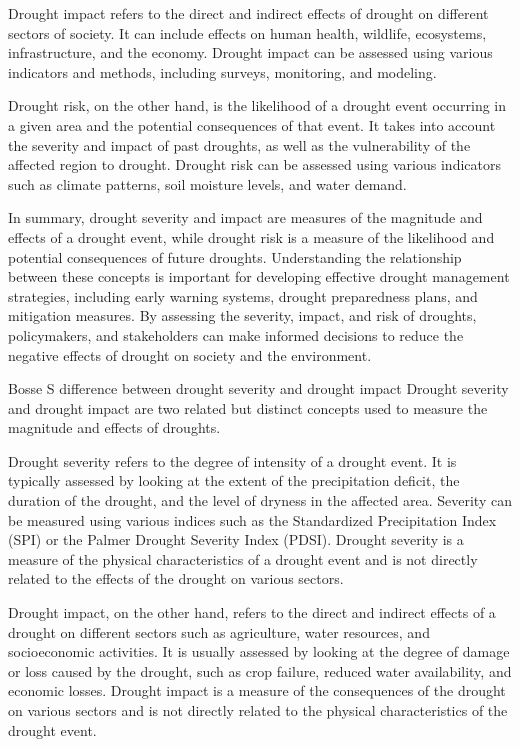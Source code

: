 {Drought impact refers to the direct and indirect effects of drought on different sectors of society. It can include effects on human health, wildlife, ecosystems, infrastructure, and the economy. Drought impact can be assessed using various indicators and methods, including surveys, monitoring, and modeling.

Drought risk, on the other hand, is the likelihood of a drought event occurring in a given area and the potential consequences of that event. It takes into account the severity and impact of past droughts, as well as the vulnerability of the affected region to drought. Drought risk can be assessed using various indicators such as climate patterns, soil moisture levels, and water demand.

In summary, drought severity and impact are measures of the magnitude and effects of a drought event, while drought risk is a measure of the likelihood and potential consequences of future droughts. Understanding the relationship between these concepts is important for developing effective drought management strategies, including early warning systems, drought preparedness plans, and mitigation measures. By assessing the severity, impact, and risk of droughts, policymakers, and stakeholders can make informed decisions to reduce the negative effects of drought on society and the environment.




Bosse S
difference between drought severity and drought impact
Drought severity and drought impact are two related but distinct concepts used to measure the magnitude and effects of droughts.

Drought severity refers to the degree of intensity of a drought event. It is typically assessed by looking at the extent of the precipitation deficit, the duration of the drought, and the level of dryness in the affected area. Severity can be measured using various indices such as the Standardized Precipitation Index (SPI) or the Palmer Drought Severity Index (PDSI). Drought severity is a measure of the physical characteristics of a drought event and is not directly related to the effects of the drought on various sectors.

Drought impact, on the other hand, refers to the direct and indirect effects of a drought on different sectors such as agriculture, water resources, and socioeconomic activities. It is usually assessed by looking at the degree of damage or loss caused by the drought, such as crop failure, reduced water availability, and economic losses. Drought impact is a measure of the consequences of the drought on various sectors and is not directly related to the physical characteristics of the drought event.

}
